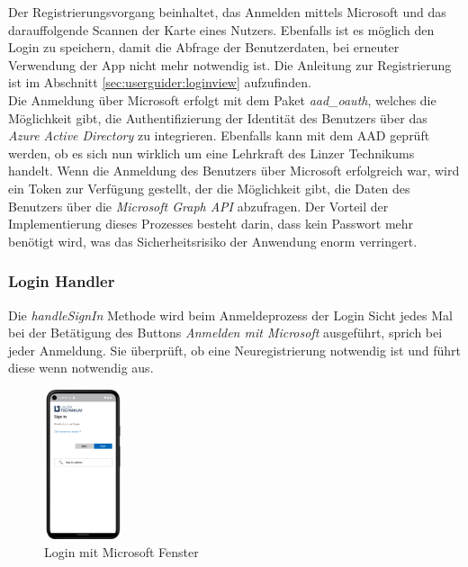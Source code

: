 \label{subsec:impl:login}
Der Registrierungsvorgang beinhaltet, das Anmelden mittels Microsoft und das darauffolgende Scannen der Karte eines Nutzers. Ebenfalls ist es m\"oglich den Login zu speichern, damit die Abfrage der Benutzerdaten, bei erneuter Verwendung der App nicht mehr notwendig ist. Die Anleitung zur Registrierung ist im Abschnitt \ref{sec:userguider:loginview}  aufzufinden.
\\
Die Anmeldung über Microsoft erfolgt mit dem Paket {\textit{aad\_oauth}}, welches  die Möglichkeit gibt, die Authentifizierung der Identität des Benutzers über das {\textit{Azure Active Directory}} zu integrieren. Ebenfalls kann mit dem AAD geprüft werden, ob es sich nun wirklich um eine Lehrkraft des Linzer Technikums handelt. Wenn die Anmeldung des Benutzers über Microsoft erfolgreich war, wird ein Token zur Verfügung gestellt, der  die Möglichkeit gibt, die Daten des Benutzers über die {\textit{Microsoft Graph API}} abzufragen. Der Vorteil der Implementierung dieses Prozesses besteht darin, dass kein Passwort mehr benötigt wird, was das Sicherheitsrisiko der Anwendung enorm verringert.

\subsubsection{Login Handler}
Die {\textit{handleSignIn}} Methode wird beim Anmeldeprozess der Login Sicht jedes Mal bei der Betätigung des Buttons {\textit{Anmelden mit Microsoft}} ausgeführt, sprich bei jeder Anmeldung. Sie überprüft, ob eine Neuregistrierung notwendig ist und führt diese wenn notwendig aus.
\begin{figure}[h!]
\centering
\includegraphics[width=0.2\textwidth]{FLUTTER/images/GP/Login_Micro.png}
\caption{Login mit Microsoft Fenster}
\end{figure}
\newpage

